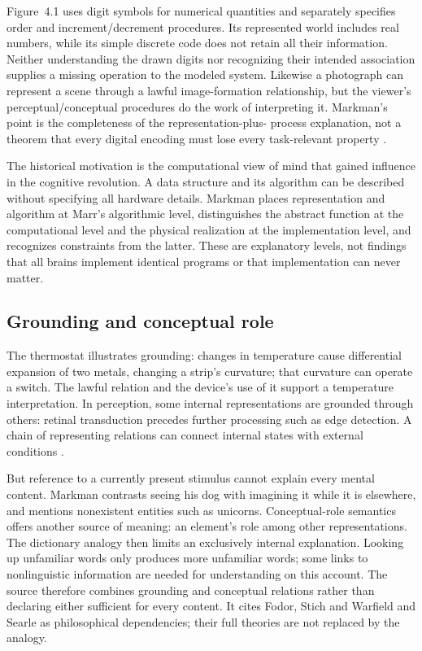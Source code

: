 Figure~4.1 uses digit symbols for numerical quantities and separately
specifies order and increment/decrement procedures. Its represented
world includes real numbers, while its simple discrete code does
not retain all their information. Neither understanding the drawn
digits nor recognizing their intended association supplies a missing
operation to the modeled system. Likewise a photograph can represent
a scene through a lawful image-formation relationship, but the
viewer's perceptual/conceptual procedures do the work of interpreting
it. Markman's point is the completeness of the representation-plus-
process explanation, not a theorem that every digital encoding must
lose every task-relevant property
\cite[pp.~36--38 and fig.~4.1]{Markman2012CognitiveRepresentation}.

The historical motivation is the computational view of mind that
gained influence in the cognitive revolution. A data structure and
its algorithm can be described without specifying all hardware
details. Markman places representation and algorithm at Marr's
algorithmic level, distinguishes the abstract function at the
computational level and the physical realization at the implementation
level, and recognizes constraints from the latter. These are
explanatory levels, not findings that all brains implement identical
programs or that implementation can never matter.

\subsection{Grounding and conceptual role}

The thermostat illustrates grounding: changes in temperature cause
differential expansion of two metals, changing a strip's curvature;
that curvature can operate a switch. The lawful relation and the
device's use of it support a temperature interpretation. In perception,
some internal representations are grounded through others: retinal
transduction precedes further processing such as edge detection.
A chain of representing relations can connect internal states with
external conditions \cite[p.~38]{Markman2012CognitiveRepresentation}.

But reference to a currently present stimulus cannot explain every
mental content. Markman contrasts seeing his dog with imagining it
while it is elsewhere, and mentions nonexistent entities such as
unicorns. Conceptual-role semantics offers another source of meaning:
an element's role among other representations. The dictionary analogy
then limits an exclusively internal explanation. Looking up unfamiliar
words only produces more unfamiliar words; some links to nonlinguistic
information are needed for understanding on this account. The source
therefore combines grounding and conceptual relations rather than
declaring either sufficient for every content. It cites Fodor,
Stich and Warfield and Searle as philosophical dependencies; their
full theories are not replaced by the analogy.

